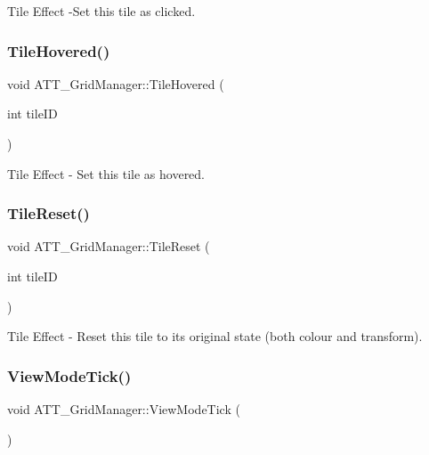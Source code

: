 Tile Effect -\/Set this tile as clicked. 

\mbox{\label{class_a_t_t___grid_manager_ae67df470fb8fde84f2fd67b3799a04d8}} 
\subsubsection{\texorpdfstring{TileHovered()}{TileHovered()}}
{\footnotesize\ttfamily void A\+T\+T\+\_\+\+Grid\+Manager\+::\+Tile\+Hovered (\begin{DoxyParamCaption}\item[{int}]{tile\+ID }\end{DoxyParamCaption})}



Tile Effect -\/ Set this tile as hovered. 

\mbox{\label{class_a_t_t___grid_manager_a7ff2d0e2f13412c3d0aba2393f9f7e5f}} 
\subsubsection{\texorpdfstring{TileReset()}{TileReset()}}
{\footnotesize\ttfamily void A\+T\+T\+\_\+\+Grid\+Manager\+::\+Tile\+Reset (\begin{DoxyParamCaption}\item[{int}]{tile\+ID }\end{DoxyParamCaption})}



Tile Effect -\/ Reset this tile to its original state (both colour and transform). 

\mbox{\label{class_a_t_t___grid_manager_af9a2760978252820113e0c370b62f234}} 
\subsubsection{\texorpdfstring{ViewModeTick()}{ViewModeTick()}}
{\footnotesize\ttfamily void A\+T\+T\+\_\+\+Grid\+Manager\+::\+View\+Mode\+Tick (\begin{DoxyParamCaption}{ }\end{DoxyParamCaption})}



